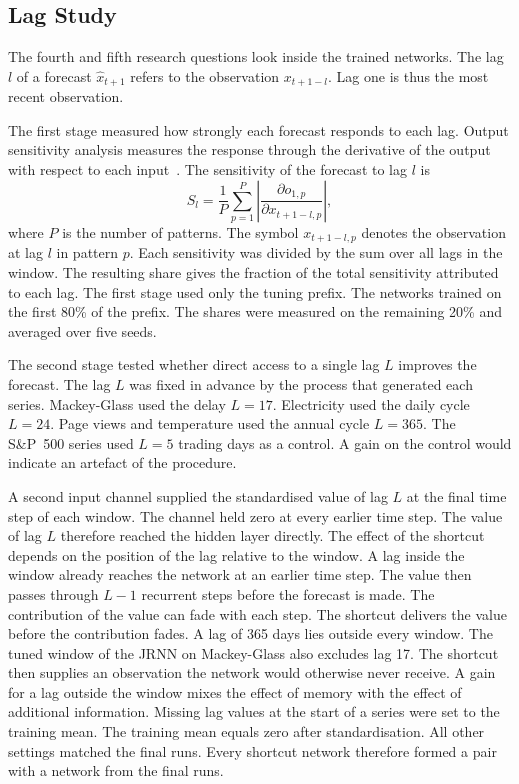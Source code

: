 \documentclass[conference,10pt]{IEEEtran}
\begin{document}
\subsection{Lag Study}

The fourth and fifth research questions look inside the trained
networks.
The lag $l$ of a forecast $\hat{x}_{t+1}$ refers to the observation
$x_{t+1-l}$.
Lag one is thus the most recent observation.

The first stage measured how strongly each forecast responds to each
lag.
Output sensitivity analysis measures the response through the
derivative of the output with respect to each input~\cite{engelbrecht1995}.
The sensitivity of the forecast to lag $l$ is
\begin{equation}
S_l = \frac{1}{P}\sum_{p=1}^{P}
\left| \frac{\partial o_{1,p}}{\partial x_{t+1-l,p}} \right|,
\label{eq:sensitivity}
\end{equation}
where $P$ is the number of patterns.
The symbol $x_{t+1-l,p}$ denotes the observation at lag $l$ in pattern
$p$.
Each sensitivity was divided by the sum over all lags in the window.
The resulting share gives the fraction of the total sensitivity
attributed to each lag.
The first stage used only the tuning prefix.
The networks trained on the first 80\% of the prefix.
The shares were measured on the remaining 20\% and averaged over five
seeds.

The second stage tested whether direct access to a single lag $L$
improves the forecast.
The lag $L$ was fixed in advance by the process that generated each
series.
Mackey-Glass used the delay $L = 17$.
Electricity used the daily cycle $L = 24$.
Page views and temperature used the annual cycle $L = 365$.
The S\&P~500 series used $L = 5$ trading days as a control.
A gain on the control would indicate an artefact of the procedure.

A second input channel supplied the standardised value of lag $L$ at
the final time step of each window.
The channel held zero at every earlier time step.
The value of lag $L$ therefore reached the hidden layer directly.
The effect of the shortcut depends on the position of the lag relative
to the window.
A lag inside the window already reaches the network at an earlier time
step.
The value then passes through $L-1$ recurrent steps before the forecast
is made.
The contribution of the value can fade with each step.
The shortcut delivers the value before the contribution fades.
A lag of 365 days lies outside every window.
The tuned window of the JRNN on Mackey-Glass also excludes lag 17.
The shortcut then supplies an observation the network would otherwise
never receive.
A gain for a lag outside the window mixes the effect of memory with the
effect of additional information.
Missing lag values at the start of a series were set to the training
mean.
The training mean equals zero after standardisation.
All other settings matched the final runs.
Every shortcut network therefore formed a pair with a network from the
final runs.
\end{document}

